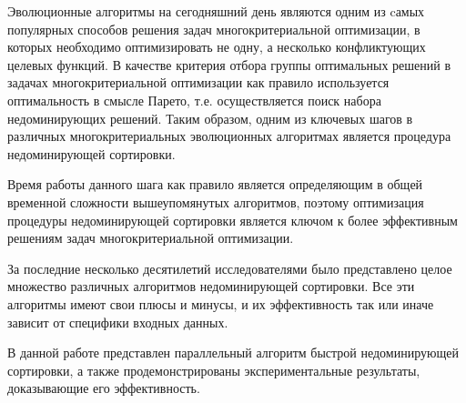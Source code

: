 \startprefacepage
Эволюционные алгоритмы на сегодняшний день являются одним из cамых популярных способов решения задач многокритериальной оптимизации, в которых необходимо оптимизировать не одну, а несколько конфликтующих целевых функций.
В качестве критерия отбора группы оптимальных решений в задачах многокритериальной оптимизации как правило используется оптимальность в смысле Парето, т.е. осуществляется поиск набора недоминирующих решений.
Таким образом, одним из ключевых шагов в различных многокритериальных эволюционных алгоритмах является процедура недоминирующей сортировки.

Время работы данного шага как правило является определяющим в общей временной сложности вышеупомянутых алгоритмов, поэтому оптимизация процедуры недоминирующей сортировки является ключом к более эффективным решениям задач многокритериальной оптимизации.

За последние несколько десятилетий исследователями было представлено целое множество различных алгоритмов недоминирующей сортировки.
Все эти алгоритмы имеют свои плюсы и минусы, и их эффективность так или иначе зависит от специфики входных данных.

В данной работе представлен параллельный алгоритм быстрой недоминирующей сортировки, а также продемонстрированы экспериментальные результаты, доказывающие его эффективность.
